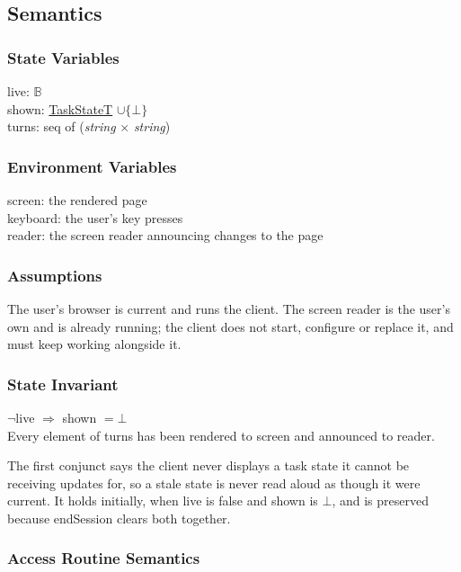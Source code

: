 \documentclass[12pt, titlepage]{article}
\newcommand{\str}{\textit{string}}
\newcommand{\B}{\mathbb{B}}
\newcommand{\nil}{\bot}
\begin{document}
\subsection{Semantics}

\subsubsection{State Variables}

\noindent live: $\B$\\
shown: \hyperref[type:TaskState]{TaskStateT} $\cup \{\nil\}$\\
turns: seq of (\str{} $\times$ \str)

\subsubsection{Environment Variables}

screen: the rendered page\\
keyboard: the user's key presses\\
reader: the screen reader announcing changes to the page

\subsubsection{Assumptions}

The user's browser is current and runs the client. The screen reader is the
user's own and is already running; the client does not start, configure or
replace it, and must keep working alongside it.

\subsubsection{State Invariant}

\noindent $\lnot$live $\Rightarrow$ shown $= \nil$\\
Every element of turns has been rendered to screen and announced to reader.

\noindent The first conjunct says the client never displays a task state it
cannot be receiving updates for, so a stale state is never read aloud as though
it were current. It holds initially, when live is false and shown is $\nil$, and
is preserved because endSession clears both together.

\subsubsection{Access Routine Semantics}
\end{document}
